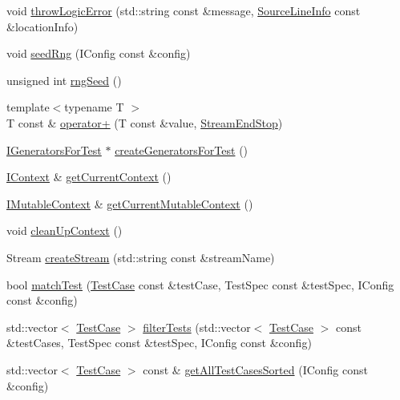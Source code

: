 \begin{DoxyCompactItemize}
\item 
void \hyperlink{namespace_catch_a702b612f683d154c466ea8297ed4a20d}{throw\+Logic\+Error} (std\+::string const \&message, \hyperlink{struct_catch_1_1_source_line_info}{Source\+Line\+Info} const \&location\+Info)
\item 
void \hyperlink{namespace_catch_a161400810eb0995394d6d8d3cae821ad}{seed\+Rng} (I\+Config const \&config)
\item 
unsigned int \hyperlink{namespace_catch_acf5ea05e942d2d7fe79111e12754ed76}{rng\+Seed} ()
\item 
{\footnotesize template$<$typename T $>$ }\\T const  \& \hyperlink{namespace_catch_a5e95b3c47a7618db3649dc39b0bb9004}{operator+} (T const \&value, \hyperlink{struct_catch_1_1_stream_end_stop}{Stream\+End\+Stop})
\item 
\hyperlink{struct_catch_1_1_i_generators_for_test}{I\+Generators\+For\+Test} $\ast$ \hyperlink{namespace_catch_a3d93b31e88fd01ee9e0d20757ff64eab}{create\+Generators\+For\+Test} ()
\item 
\hyperlink{struct_catch_1_1_i_context}{I\+Context} \& \hyperlink{namespace_catch_ad517cca9b21deb79101e90e5508dd161}{get\+Current\+Context} ()
\item 
\hyperlink{struct_catch_1_1_i_mutable_context}{I\+Mutable\+Context} \& \hyperlink{namespace_catch_af7bb0c32ab2453d2f53e92a96d15360e}{get\+Current\+Mutable\+Context} ()
\item 
void \hyperlink{namespace_catch_ae50508f10ffc4ed873a31a4db4caea16}{clean\+Up\+Context} ()
\item 
Stream \hyperlink{namespace_catch_ad7591011c5d99d59504ecd3384001c3e}{create\+Stream} (std\+::string const \&stream\+Name)
\item 
bool \hyperlink{namespace_catch_aadef80fbc6bc84589777a462770cef49}{match\+Test} (\hyperlink{class_catch_1_1_test_case}{Test\+Case} const \&test\+Case, Test\+Spec const \&test\+Spec, I\+Config const \&config)
\item 
std\+::vector$<$ \hyperlink{class_catch_1_1_test_case}{Test\+Case} $>$ \hyperlink{namespace_catch_ab5da9aa67c42a3f626aea07d0b556829}{filter\+Tests} (std\+::vector$<$ \hyperlink{class_catch_1_1_test_case}{Test\+Case} $>$ const \&test\+Cases, Test\+Spec const \&test\+Spec, I\+Config const \&config)
\item 
std\+::vector$<$ \hyperlink{class_catch_1_1_test_case}{Test\+Case} $>$ const  \& \hyperlink{namespace_catch_a1c9b1a23bc947ea70ddaabf067276cf2}{get\+All\+Test\+Cases\+Sorted} (I\+Config const \&config)

\end{DoxyCompactItemize}
